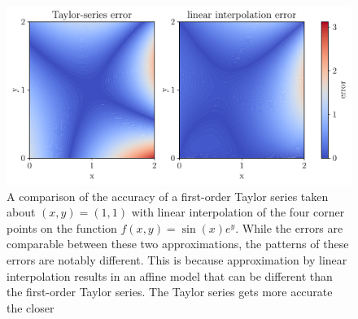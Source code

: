 \begin{figure}
    \centering
    \includegraphics[width=0.9\linewidth]{bundles/interp_fig.pdf}
    \caption{A comparison of the accuracy of a first-order Taylor series taken about $(x,y)=(1,1)$ with linear interpolation of the four corner points on the function $f(x,y) = \sin(x)e^{y}$. While the errors are comparable between these two approximations, the patterns of these errors are notably different. This is because approximation by linear interpolation results in an affine model that can be different than the first-order Taylor series. The Taylor series gets more accurate the closer}
    \label{fig:btb:interp}
\end{figure}





